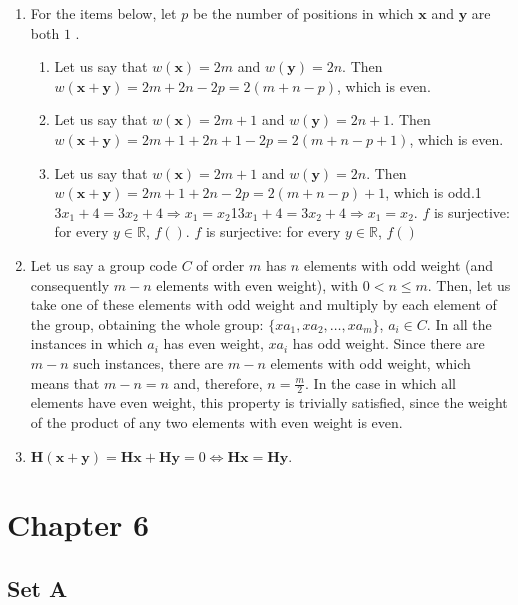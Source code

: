 \documentclass{article}
\begin{document}
\begin{enumerate}
    \item For the items below, let $p$ be the number of positions in which $\mathbf{x}$ and $\mathbf{y}$ are both $1$ .
        \begin{enumerate}[label=(\alph*)]
            \item Let us say that $w(\mathbf{x}) = 2m$ and $w(\mathbf{y}) = 2n$. Then $w(\mathbf{x} + \mathbf{y}) = 2m + 2n - 2p = 2(m + n - p)$, which is even.

            \item Let us say that $w(\mathbf{x}) = 2m + 1$ and $w(\mathbf{y}) = 2n + 1$. Then $w(\mathbf{x} + \mathbf{y}) = 2m + 1 + 2n + 1 - 2p = 2(m + n - p + 1)$, which is even.

            \item Let us say that $w(\mathbf{x}) = 2m + 1$ and $w(\mathbf{y}) = 2n$. Then $w(\mathbf{x} + \mathbf{y}) = 2m + 1 + 2n - 2p = 2(m + n - p) + 1$, which is odd.1$3x_1 + 4 = 3x_2 + 4 \Rightarrow x_1 = x_2$1$3x_1 + 4 = 3x_2 + 4 \Rightarrow x_1 = x_2$. $f$ is surjective: for every $y \in \mathbb{R}$, $f()$. $f$ is surjective: for every $y \in \mathbb{R}$, $f()$
        \end{enumerate}

    \item Let us say a group code $C$ of order $m$ has $n$ elements with odd weight (and consequently $m - n$ elements with even weight), with $0 < n \leqslant m$. Then, let us take one of these elements with odd weight and multiply by each element of the group, obtaining the whole group: $\{xa_1, xa_2, \ldots, xa_m\}$, $a_i \in C$. In all the instances in which $a_i$ has even weight, $xa_i$ has odd weight. Since there are $m - n$ such instances, there are $m - n$ elements with odd weight, which means that $m - n = n$ and, therefore, $n = \frac{m}{2}$. In the case in which all elements have even weight, this property is trivially satisfied, since the weight of the product of any two elements with even weight is even.

    \item $\mathbf{H}(\mathbf{x} + \mathbf{y}) = \mathbf{H}\mathbf{x} + \mathbf{H}\mathbf{y} = 0 \Leftrightarrow \mathbf{H}\mathbf{x} = \mathbf{H}\mathbf{y}$.
\end{enumerate}

\section{Chapter 6}
\subsection{Set A}
\end{document}
